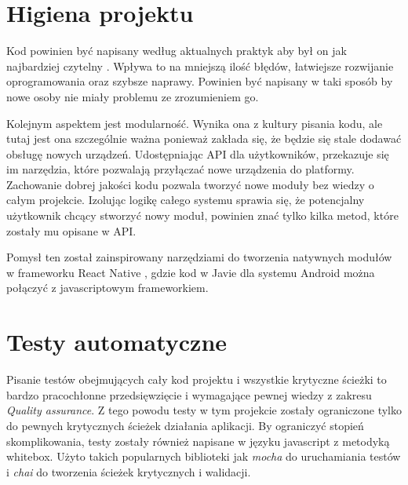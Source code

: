 \section{Higiena projektu}
Kod powinien być napisany według aktualnych praktyk aby był on jak najbardziej czytelny \cite{cleancode}. Wpływa to na mniejszą ilość błędów, łatwiejsze rozwijanie  oprogramowania oraz szybsze naprawy. Powinien być napisany w taki sposób by nowe osoby nie miały problemu ze zrozumieniem go. \par
Kolejnym aspektem jest modularność. Wynika ona z kultury pisania kodu, ale tutaj jest ona szczególnie ważna ponieważ zakłada się, że będzie się stale dodawać obsługę nowych urządzeń. Udostępniając API dla użytkowników, przekazuje się im narzędzia, które pozwalają przyłączać nowe urządzenia do platformy. Zachowanie dobrej jakości kodu pozwala tworzyć nowe moduły bez wiedzy o całym projekcie. Izolując logikę całego systemu sprawia się, że potencjalny użytkownik chcący stworzyć nowy moduł, powinien znać tylko kilka metod, które zostały mu opisane w API.
\par Pomysł ten został zainspirowany narzędziami do tworzenia natywnych modułów w frameworku React Native \cite{ReactNativeModules}, gdzie kod w Javie dla systemu Android można połączyć z javascriptowym frameworkiem.
\section{Testy automatyczne}
Pisanie testów obejmujących cały kod projektu i wszystkie krytyczne ścieżki to bardzo pracochłonne przedsięwzięcie i wymagające pewnej wiedzy z zakresu \textit{Quality assurance}. Z tego powodu testy w tym projekcie zostały ograniczone tylko do pewnych krytycznych ścieżek działania aplikacji. By ograniczyć stopień skomplikowania, testy zostały również napisane w języku javascript z metodyką whitebox. Użyto takich popularnych biblioteki jak \textit{mocha} \cite{mocha} do uruchamiania testów i \textit{chai} \cite{chai} do tworzenia ścieżek krytycznych i walidacji.
